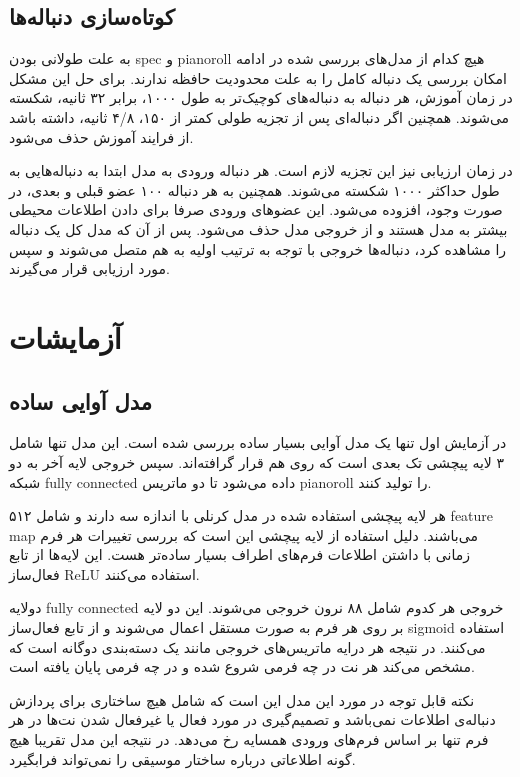 \subsection{کوتاه‌سازی دنباله‌ها}
به علت طولانی بودن \gls{spec} و \gls{pianoroll} هیچ کدام از مدل‌های بررسی شده در
ادامه امکان بررسی یک دنباله کامل را به علت محدودیت حافظه ندارند. برای حل این
مشکل در زمان آموزش، هر دنباله به دنباله‌های کوچیک‌تر به طول ۱۰۰۰، برابر ۳۲
ثانیه، شکسته می‌شوند. همچنین اگر دنباله‌ای پس از تجزیه طولی کمتر از ۱۵۰، ۴/۸
ثانیه، داشته باشد از فرایند آموزش حذف می‌شود.

در زمان ارزیابی نیز این تجزیه لازم است. هر دنباله ورودی به مدل ابتدا به
دنباله‌هایی به طول حداکثر ۱۰۰۰ شکسته می‌شوند. همچنین به هر دنباله ۱۰۰ عضو قبلی و
بعدی، در صورت وجود، افزوده می‌شود. این عضوهای ورودی صرفا برای دادن اطلاعات محیطی
بیشتر به مدل هستند و از خروجی مدل حذف می‌شود. پس از آن که مدل کل یک دنباله را
مشاهده کرد، دنباله‌ها خروجی با توجه به ترتیب اولیه به هم متصل می‌شوند و سپس مورد
ارزیابی قرار می‌گیرند.

\section{آزمایشات}
\subsection{مدل آوایی ساده}
در آزمایش اول تنها یک مدل آوایی بسیار ساده بررسی شده است. این مدل تنها شامل ۳
لایه پیچشی تک بعدی است که روی هم قرار گرافته‌اند. سپس خروجی لایه آخر به دو شبکه
\gls{fully connected} داده می‌شود تا دو ماتریس \gls{pianoroll} را تولید کنند.

هر لایه پیچشی استفاده شده در مدل کرنلی با اندازه سه دارند و شامل ۵۱۲
\gls{feature map} می‌باشند. دلیل استفاده از لایه پیچشی این است که بررسی تغییرات
هر فرم زمانی با داشتن اطلاعات فرم‌های اطراف بسیار ساده‌تر هست. این لایه‌ها از
تابع فعال‌ساز ReLU استفاده می‌کنند.

دولایه \gls{fully connected} خروجی هر کدوم شامل ۸۸ نرون خروجی می‌شوند. این دو
لایه بر روی هر فرم به صورت مستقل اعمال می‌شوند و از تابع فعال‌ساز sigmoid
استفاده می‌کنند. در نتیجه هر درایه ماتریس‌های خروجی مانند یک دسته‌بندی دوگانه
است که مشخص می‌کند هر نت در چه فرمی شروع شده و در چه فرمی پایان یافته است.

نکته قابل توجه در مورد این مدل این است که شامل هیچ ساختاری برای پردازش دنباله‌ی
اطلاعات نمی‌باشد و تصمیم‌گیری در مورد فعال یا غیرفعال شدن نت‌ها در هر فرم تنها
بر اساس فرم‌های ورودی همسایه رخ می‌دهد. در نتیجه این مدل تقریبا هیچ گونه
اطلاعاتی درباره ساختار موسیقی را نمی‌تواند فرابگیرد.

